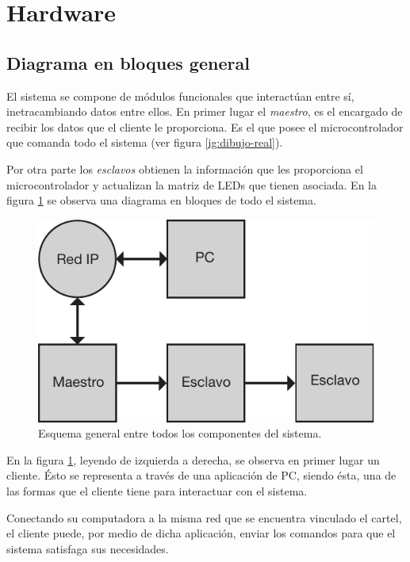 \section{Hardware}\label{sec:hw}
\subsection{Diagrama en bloques general}
El sistema se compone de módulos funcionales que interactúan entre sí, inetracambiando datos entre ellos. En primer lugar el \emph{maestro}, es el encargado de recibir los datos que el cliente le proporciona. Es el que posee el microcontrolador que comanda todo el sistema (ver figura \ref{ig:dibujo-real}).

Por otra parte los \emph{esclavos} obtienen la información que les proporciona el microcontrolador y actualizan la matriz de LEDs que tienen asociada. En la figura \ref{fig:diagrama-bloques-general} se observa una diagrama en bloques de todo el sistema.

\begin{figure}[!ht]
	\centering
	\includegraphics[scale=0.8]{imagenes/esquema-general.pdf}
	\caption{Esquema general entre todos los componentes del sistema.}
	\label{fig:diagrama-bloques-general}
\end{figure}

En la figura \ref{fig:diagrama-bloques-general}, leyendo de izquierda a derecha, se observa en primer lugar un cliente. Ésto se representa a través de una aplicación de PC, siendo ésta, una de las formas que el cliente tiene para interactuar con el sistema.

Conectando su computadora a la misma red que se encuentra vinculado el cartel, el cliente puede, por medio de dicha aplicación, enviar los comandos para que el sistema satisfaga sus necesidades.


